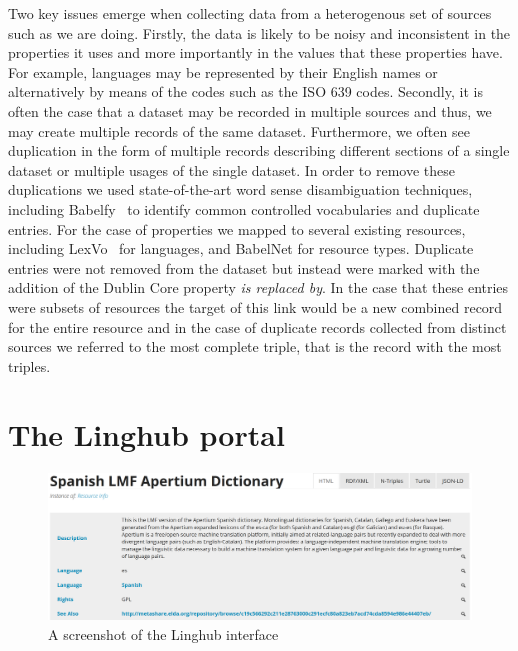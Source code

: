 \documentclass[11pt]{article}
\begin{document}
Two key issues emerge when collecting data from a heterogenous set of sources 
such as we are doing. Firstly, the data is likely to be noisy and inconsistent 
in the properties it uses and more importantly in the values that these
properties have. For example, languages may be represented by their English 
names or alternatively by means of the codes such as the ISO 639 codes. Secondly,
it is often the case that a dataset may be recorded in multiple sources and thus,
we may create multiple records of the same dataset. Furthermore, we often see
duplication in the form of multiple records describing different sections of a 
single dataset or multiple usages of the single dataset. In order to remove 
these duplications we used state-of-the-art word sense disambiguation techniques, 
including Babelfy~\cite{Moroetal:14tacl} to identify common controlled vocabularies and duplicate
entries. For the case of properties we mapped to several existing resources, 
including LexVo~\cite{de2013lexvo} for languages, and BabelNet for resource types. Duplicate 
entries were not removed from the dataset but instead were marked with the addition
of the Dublin Core property \emph{is replaced by}. In the case that these entries
were subsets of resources the target of this link would be a new combined record
for the entire resource and in the case of duplicate records collected from distinct
sources we referred to the most complete triple, that is the record with the most
triples.

\section{The Linghub portal}

\begin{figure}
\includegraphics[width=.9\textwidth]{linghub-screenshot.png}
\caption{A screenshot of the Linghub interface\label{fig:screenshot}}
\end{figure}
\end{document}
